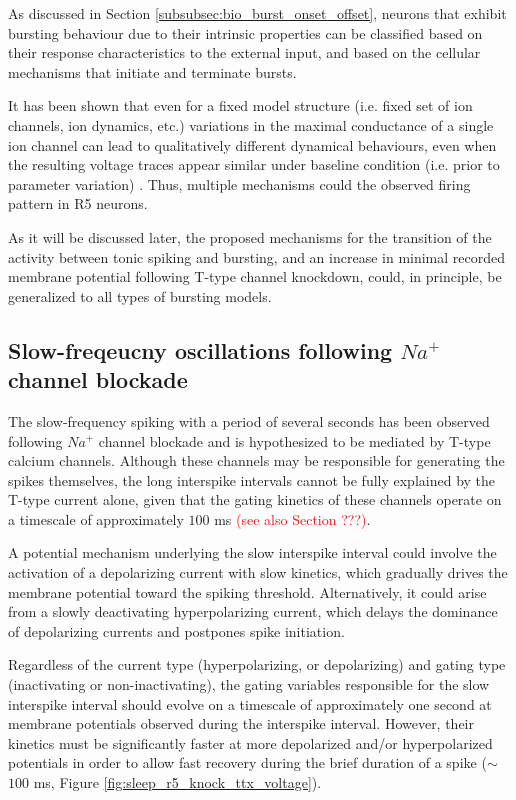 \documentclass[../main.tex]{subfiles}
\begin{document}
As discussed in Section \ref{subsubsec:bio_burst_onset_offset}, neurons that exhibit bursting behaviour due to their intrinsic properties can be classified based on their response characteristics to the external input, and based on the cellular mechanisms that initiate and terminate bursts.

It has been shown that even for a fixed model structure (i.e. fixed set of ion channels, ion dynamics, etc.) variations in the maximal conductance of a single ion channel can lead to qualitatively different dynamical behaviours, even when the resulting voltage traces appear similar under baseline condition (i.e. prior to parameter variation) \parencite{alonsoVisualizationCurrentsNeural2019}.
Thus, multiple mechanisms could the observed firing pattern in R5 neurons.

As it will be discussed later, the proposed mechanisms for the transition of the activity between tonic spiking and bursting, and an increase in minimal recorded membrane potential following T-type channel knockdown, could, in principle, be generalized to all types of bursting models.


\subsection{Slow-freqeucny oscillations following $Na^{+}$ channel blockade}

The slow-frequency spiking with a period of several seconds has been observed following $Na^+$ channel blockade and is hypothesized to be mediated by T-type calcium channels.
Although these channels may be responsible for generating the spikes themselves, the long interspike intervals cannot be fully explained by the T-type current alone, given that the gating kinetics of these channels operate on a timescale of approximately $100$ ms \parencite{jeongCaa1TFlyTtype2015} \textcolor{red}{(see also Section ???)}.

A potential mechanism underlying the slow interspike interval could involve the activation of a depolarizing current with slow kinetics, which gradually drives the membrane potential toward the spiking threshold. Alternatively, it could arise from a slowly deactivating hyperpolarizing current, which delays the dominance of depolarizing currents and postpones spike initiation.

Regardless of the current type (hyperpolarizing, or depolarizing) and gating type (inactivating or non-inactivating),  the gating variables responsible for the slow interspike interval should evolve on a timescale of approximately one second at membrane potentials observed during the interspike interval. However, their kinetics must be significantly faster at more depolarized and/or hyperpolarized potentials in order to allow fast recovery during the brief duration of a spike ($\sim$$100$ ms, Figure \ref{fig:sleep_r5_knock_ttx_voltage}).
\end{document}
